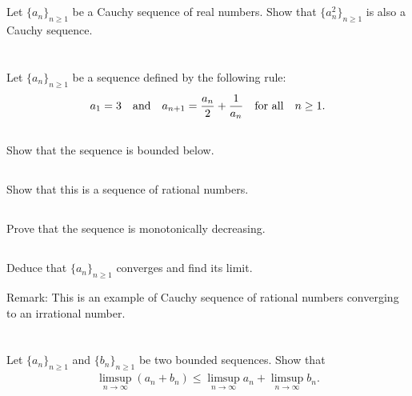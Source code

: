 \documentclass[11pt,letterpaper]{article}
\begin{document}
\section{}
Let $\{a_n\}_{n\geq 1}$ be a Cauchy sequence of real numbers. Show that
$\{a_n^2\}_{n\geq 1}$ is also a Cauchy sequence.

\section{}
Let $\{a_n\}_{n\geq 1}$ be a sequence defined by the following rule:
\begin{align}
    a_1 = 3 \quad \mbox{and} \quad a_{n+1}=\frac{a_n}{2}+\frac{1}{a_n} \quad \mbox{for all} \quad n\geq 1.
\end{align}

\subsection{} Show that the sequence is bounded below.

\subsection{} Show that this is a sequence of rational numbers.

\subsection{} Prove that the sequence is monotonically decreasing.

\subsection{} Deduce that $\{a_n\}_{n\geq 1}$ converges and find its limit.

Remark: This is an example of Cauchy sequence of rational numbers
converging to an irrational number.

\section{}
Let $\{a_n\}_{n\geq 1}$ and $\{b_n\}_{n\geq 1}$ be two bounded sequences. Show that
\begin{align}
    \limsup_{n\to\infty} (a_n+b_n) \leq \limsup_{n\to\infty} a_n+\limsup_{n\to\infty} b_n.
\end{align}

\end{document}
